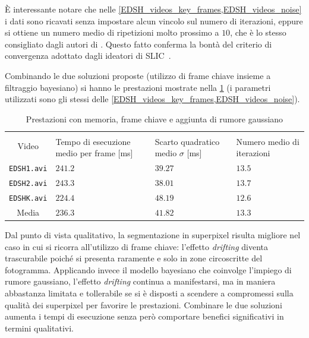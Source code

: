 \documentclass[12pt,a4paper,oneside]{article}
\begin{document}
\noindent È interessante notare che nelle \cref{EDSH_videos_key_frames,EDSH_videos_noise} i dati sono ricavati senza impostare alcun vincolo sul numero di iterazioni, eppure si ottiene un numero medio di ripetizioni molto prossimo a $10$, che è lo stesso consigliato dagli autori di \cite{ACHANTA_SLIC}. Questo fatto conferma la bontà del criterio di convergenza adottato dagli ideatori di \gls{SLIC}~\cite{ACHANTA_SLIC}.

Combinando le due soluzioni proposte (utilizzo di frame chiave insieme a filtraggio bayesiano) si hanno le prestazioni mostrate nella \cref{EDSH_videos_key_frames_noise} (i parametri utilizzati sono gli stessi delle \cref{EDSH_videos_key_frames,EDSH_videos_noise}).

\begin{table}[!htb]
	\renewcommand{\arraystretch}{1.3}
	\centering
	\begin{tabular}{|c||>{\centering\arraybackslash}m{}|>{\centering\arraybackslash}m{}|>{\centering\arraybackslash}m{}|}
	    \hline
		\multirow{2}{*}{\vspace{-6ex}Video}
		& \multicolumn{3}{c|}{VideoSLIC}\\\cline{2-4}
		& Tempo di esecuzione medio per frame [ms] & Scarto quadratico medio $\sigma$ [ms] & Numero medio di iterazioni\\
		\hline\hline
		\texttt{EDSH1.avi} & $241.2$ & $39.27$ & $13.5$ \\\hline
		\texttt{EDSH2.avi} & $243.3$ & $38.01$ & $13.7$ \\\hline
		\texttt{EDSHK.avi} & $224.4$ & $48.19$ & $12.6$ \\\hline\hline
		Media              & $236.3$ & $41.82$ & $13.3$ \\\hline
	\end{tabular}
	\captionsetup{justification=centering}
	\caption{Prestazioni con memoria, frame chiave e aggiunta di rumore gaussiano}
	\label{EDSH_videos_key_frames_noise}
\end{table}

\noindent Dal punto di vista qualitativo, la segmentazione in superpixel risulta migliore nel caso in cui si ricorra all'utilizzo di frame chiave: l'effetto \textit{drifting} diventa trascurabile poiché si presenta raramente e solo in zone circoscritte del fotogramma. Applicando invece il modello bayesiano che coinvolge l'impiego di rumore gaussiano, l'effetto \textit{drifting} continua a manifestarsi, ma in maniera abbastanza limitata e tollerabile se si è disposti a scendere a compromessi sulla qualità dei superpixel per favorire le prestazioni. Combinare le due soluzioni aumenta i tempi di esecuzione senza però comportare benefici significativi in termini qualitativi.
\end{document}
